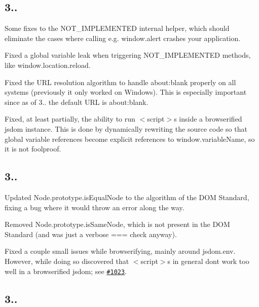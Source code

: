 \subsection*{3..}


\begin{DoxyItemize}
\item Some fixes to the {\ttfamily N\+O\+T\+\_\+\+I\+M\+P\+L\+E\+M\+E\+N\+T\+ED} internal helper, which should eliminate the cases where calling e.\+g. {\ttfamily window.\+alert} crashes your application.
\item Fixed a global variable leak when triggering {\ttfamily N\+O\+T\+\_\+\+I\+M\+P\+L\+E\+M\+E\+N\+T\+ED} methods, like {\ttfamily window.\+location.\+reload}.
\item Fixed the U\+RL resolution algorithm to handle {\ttfamily about\+:blank} properly on all systems (previously it only worked on Windows). This is especially important since as of 3.. the default U\+RL is {\ttfamily about\+:blank}.
\item Fixed, at least partially, the ability to run {\ttfamily $<$script$>$}s inside a browserified jsdom instance. This is done by dynamically rewriting the source code so that global variable references become explicit references to {\ttfamily window.\+variable\+Name}, so it is not foolproof.
\end{DoxyItemize}

\subsection*{3..}


\begin{DoxyItemize}
\item Updated {\ttfamily Node.\+prototype.\+is\+Equal\+Node} to the algorithm of the D\+OM Standard, fixing a bug where it would throw an error along the way.
\item Removed {\ttfamily Node.\+prototype.\+is\+Same\+Node}, which is not present in the D\+OM Standard (and was just a verbose {\ttfamily ===} check anyway).
\item Fixed a couple small issues while browserifying, mainly around {\ttfamily jsdom.\+env}. However, while doing so discovered that {\ttfamily $<$script$>$}s in general don\textquotesingle{}t work too well in a browserified jsdom; see \href{https://github.com/tmpvar/jsdom/issues/1023}{\tt \#1023}.
\end{DoxyItemize}

\subsection*{3..}


